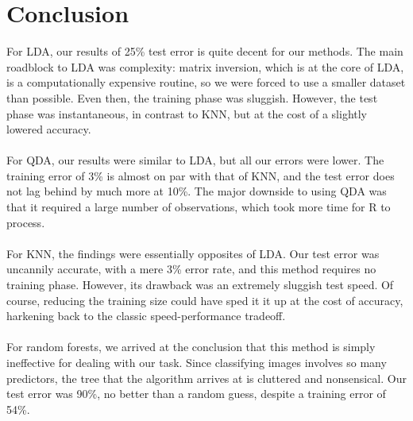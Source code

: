 \documentclass[10pt]{extarticle}
\begin{document}
\section{Conclusion}
For LDA, our results of 25\% test error is quite decent for our methods. The main roadblock to LDA was complexity: matrix inversion, which is at the core of LDA, is a computationally expensive routine, so we were forced to use a smaller dataset than possible. Even then, the training phase was sluggish. However, the test phase was instantaneous, in contrast to KNN, but at the cost of a slightly lowered accuracy. \\\\
For QDA, our results were similar to LDA, but all our errors were lower. The training error of 3\% is almost on par with that of KNN, and the test error does not lag behind by much more at 10\%. The major downside to using QDA was that it required a large number of observations, which took more time for R to process.\\\\
For KNN, the findings were essentially opposites of LDA. Our test error was uncannily accurate, with a mere 3\% error rate, and this method requires no training phase. However, its drawback was an extremely sluggish test speed. Of course, reducing the training size could have sped it it up at the cost of accuracy, harkening back to the classic speed-performance tradeoff. \\\\
For random forests, we arrived at the conclusion that this method is simply ineffective for dealing with our task. Since classifying images involves so many predictors, the tree that the algorithm arrives at is cluttered and nonsensical. Our test error was 90\%, no better than a random guess, despite a training error of 54\%. 
\end{document}
